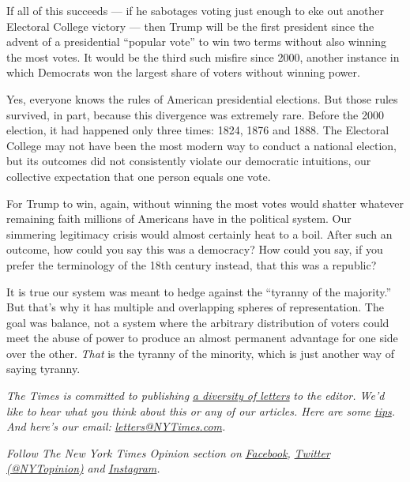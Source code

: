 If all of this succeeds --- if he sabotages voting just enough to eke
out another Electoral College victory --- then Trump will be the first
president since the advent of a presidential ``popular vote'' to win two
terms without also winning the most votes. It would be the third such
misfire since 2000, another instance in which Democrats won the largest
share of voters without winning power.

Yes, everyone knows the rules of American presidential elections. But
those rules survived, in part, because this divergence was extremely
rare. Before the 2000 election, it had happened only three times: 1824,
1876 and 1888. The Electoral College may not have been the most modern
way to conduct a national election, but its outcomes did not
consistently violate our democratic intuitions, our collective
expectation that one person equals one vote.

For Trump to win, again, without winning the most votes would shatter
whatever remaining faith millions of Americans have in the political
system. Our simmering legitimacy crisis would almost certainly heat to a
boil. After such an outcome, how could you say this was a democracy? How
could you say, if you prefer the terminology of the 18th century
instead, that this was a republic?

It is true our system was meant to hedge against the ``tyranny of the
majority.'' But that's why it has multiple and overlapping spheres of
representation. The goal was balance, not a system where the arbitrary
distribution of voters could meet the abuse of power to produce an
almost permanent advantage for one side over the other. \emph{That} is
the tyranny of the minority, which is just another way of saying
tyranny.

\emph{The Times is committed to publishing}
\href{https://www.nytimes3xbfgragh.onion/2019/01/31/opinion/letters/letters-to-editor-new-york-times-women.html}{\emph{a
diversity of letters}} \emph{to the editor. We'd like to hear what you
think about this or any of our articles. Here are some}
\href{https://help.nytimes3xbfgragh.onion/hc/en-us/articles/115014925288-How-to-submit-a-letter-to-the-editor}{\emph{tips}}\emph{.
And here's our email:}
\href{mailto:letters@NYTimes.com}{\emph{letters@NYTimes.com}}\emph{.}

\emph{Follow The New York Times Opinion section on}
\href{https://www.facebookcorewwwi.onion/nytopinion}{\emph{Facebook}}\emph{,}
\href{http://twitter.com/NYTOpinion}{\emph{Twitter (@NYTopinion)}}
\emph{and}
\href{https://www.instagram.com/nytopinion/}{\emph{Instagram}}\emph{.}

